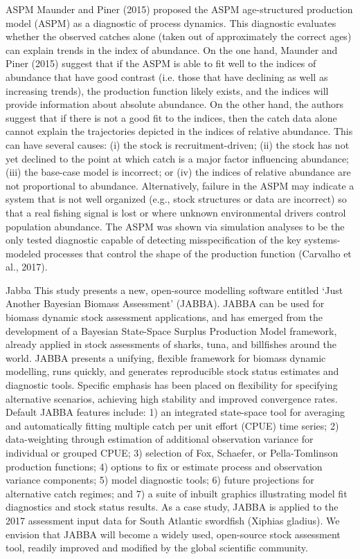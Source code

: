 \begin{description}
\item{ASPM} 
Maunder and Piner (2015) proposed the ASPM age-structured production model (ASPM) as a diagnostic of process dynamics. This diagnostic evaluates whether the observed catches alone (taken out of approximately the correct ages) can explain trends in the index of abundance. On the one hand, Maunder and Piner (2015) suggest that if the ASPM is able to fit well to the indices of abundance that have good contrast (i.e. those that have declining as well as increasing trends), the production function likely exists, and the indices will provide information about absolute abundance. On the other hand, the authors suggest that if there is not a good fit to the indices, then the catch data alone cannot explain the trajectories depicted in the indices of relative abundance. This can have several causes: (i) the stock is recruitment-driven; (ii) the stock has not yet declined to the point at which catch is a major factor influencing abundance; (iii) the base-case model is incorrect; or (iv) the indices of relative abundance are not proportional to abundance. Alternatively, failure in the ASPM may indicate a system that is not well organized (e.g., stock structures or data are incorrect) so that a real fishing signal is lost or where unknown environmental drivers control population abundance. The ASPM was shown via simulation analyses to be the only tested diagnostic capable of detecting misspecification of the key systems-modeled processes that control the shape of the production function (Carvalho et al., 2017).
\item{Jabba}
This study presents a new, open-source modelling software entitled ‘Just Another Bayesian Biomass Assessment’ (JABBA). JABBA can be used for biomass dynamic stock assessment applications, and has emerged from the development of a Bayesian State-Space Surplus Production Model framework, already applied in stock assessments of sharks, tuna, and billfishes around the world. JABBA presents a unifying, flexible framework for biomass dynamic modelling, runs quickly, and generates reproducible stock status estimates and diagnostic tools. Specific emphasis has been placed on flexibility for specifying alternative scenarios, achieving high stability and improved convergence rates. Default JABBA features include: 1) an integrated state-space tool for averaging and automatically fitting multiple catch per unit effort (CPUE) time series; 2) data-weighting through estimation of additional observation variance for individual or grouped CPUE; 3) selection of Fox, Schaefer, or Pella-Tomlinson production functions; 4) options to fix or estimate process and observation variance components; 5) model diagnostic tools; 6) future projections for alternative catch regimes; and 7) a suite of inbuilt graphics illustrating model fit diagnostics and stock status results. As a case study, JABBA is applied to the 2017 assessment input data for South Atlantic swordfish (Xiphias gladius). We envision that JABBA will become a widely used, open-source stock assessment tool, readily improved and modified by the global scientific community.
\end{description}